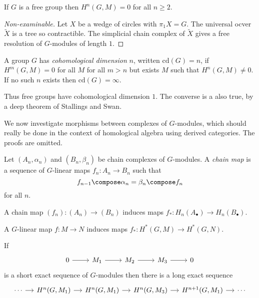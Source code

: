 \documentclass[a4paper]{article}
\begin{document}
\begin{proposition}\label{prop:cohomological dimension of free group}
  If \(G\) is a free group then \(H^n(G, M) = 0\) for all \(n \geq 2\).
\end{proposition}

\begin{proof}[Non-examinable]
  Let \(X\) be a wedge of circles with \(\pi_1 X = G\). The universal ocver \(\widetilde X\) is a tree so contractible. The simplicial chain complex of \(\widetilde X\) gives a free resolution of \(G\)-modules of length \(1\).
\end{proof}

\begin{definition}
  A group \(G\) has \emph{cohomological dimension} \(n\), written \(\mathrm{cd}(G) = n\), if \(H^m(G, M) = 0\) for all \(M\) for all \(m > n\) but exists \(M\) such that \(H^n(G, M) \ne 0\). If no such \(n\) exists then \(\mathrm{cd}(G) = \infty\).
\end{definition}

Thus free groups have cohomological dimension \(1\). The converse is a also true, by a deep theorem of Stallings and Swan.

We now investigate morphisms between complexes of \(G\)-modules, which should really be done in the context of homological algebra using derived categories. The proofs are omitted.

\begin{definition}
  Let \((A_n, \alpha_n)\) and \((B_n, \beta_n)\) be chain complexes of \(G\)-modules. A \emph{chain map} is a sequence of \(G\)-linear maps \(f_n: A_n \to B_n\) such that
  \[
    f_{n - 1} \compose \alpha_n = \beta_n \compose f_n
  \]
  for all \(n\).
\end{definition}

\begin{proposition}
  A chain map \((f_n): (A_n) \to (B_n)\) induces maps \(f_*: H_n(A_\bullet) \to H_n(B_\bullet)\).
\end{proposition}

\begin{corollary}
  A \(G\)-linear map \(f: M \to N\) induces maps \(f_*: H^*(G, M) \to H^*(G, N)\).
\end{corollary}

\begin{proposition}
  If
  \[
    \begin{tikzcd}
      0 \ar[r] & M_1 \ar[r] & M_2 \ar[r] & M_3 \ar[r] & 0
    \end{tikzcd}
  \]
  is a short exact sequence of \(G\)-modules then there is a long exact sequence
  \[
    \begin{tikzcd}[column sep=small]
      \cdots \ar[r] & H^n(G, M_1) \ar[r] & H^n(G, M_1) \ar[r] & H^n(G, M_3) \ar[r] & H^{n + 1}(G, M_1) \ar[r] & \cdots
    \end{tikzcd}
  \]
\end{proposition}
\end{document}
